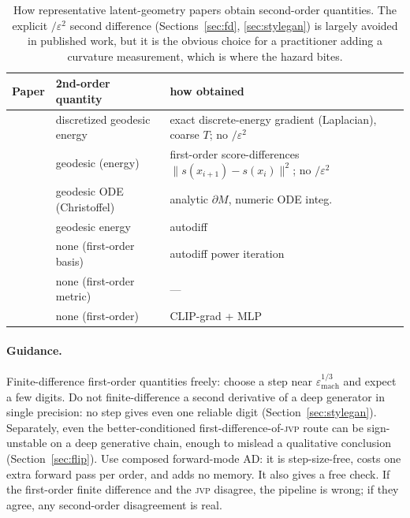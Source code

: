 \documentclass[10pt]{article} %
\newcommand{\jvp}{\textsc{jvp}}
\newcommand{\eps}{\varepsilon}
\begin{document}
\begin{table}[h]\centering
\begin{tabular}{>{\raggedright}p{4.4cm} l p{3.6cm}}
\toprule
Paper & 2nd-order quantity & how obtained \\
\midrule
\citet{shao2018} & discretized geodesic energy &
exact discrete-energy gradient (Laplacian), coarse $T$; no $/\eps^2$ \\
\citet{saito2025} & geodesic (energy) & first-order score-differences $\|s(x_{i+1}){-}s(x_i)\|^2$; no $/\eps^2$ \\
\citet{arvanitidis2018} & geodesic ODE (Christoffel) & analytic $\partial M$, numeric ODE integ. \\
\citet{yang2018} & geodesic energy & autodiff \\
\citet{park2023} & none (first-order basis) & autodiff power iteration \\
\citet{chen2018} & none (first-order metric) & --- \\
\citet{kwon2023} & none (first-order) & CLIP-grad + MLP \\
\bottomrule
\end{tabular}
\caption{How representative latent-geometry papers obtain second-order quantities.
The explicit $/\eps^2$ second difference (Sections~\ref{sec:fd},
\ref{sec:stylegan}) is largely avoided in published work, but it is the obvious
choice for a practitioner adding a curvature measurement, which is where the
hazard bites.}
\label{tab:survey}
\end{table}

\paragraph{Guidance.} Finite-difference first-order quantities freely: choose a
step near $\eps_{\mathrm{mach}}^{1/3}$ and expect a few digits. Do not
finite-difference a second derivative of a deep generator in single precision: no
step gives even one reliable digit (Section~\ref{sec:stylegan}). Separately, even
the better-conditioned first-difference-of-\jvp{} route can be sign-unstable on a
deep generative chain, enough to mislead a qualitative conclusion
(Section~\ref{sec:flip}). Use composed forward-mode AD: it is step-size-free, costs
one extra forward pass per order, and adds no memory. It also gives a free check. If the first-order finite difference and the
\jvp{} disagree, the pipeline is wrong; if they agree, any second-order
disagreement is real.
\end{document}
